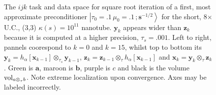 \documentclass[letterpaper,twocolumn,amsmath,amsfont,amssymb,english,aps,jcp,preprintnumbers,groupaddress,nofootinbib,tightenlines,floatfix]{revtex4}
\newcommand{\mat}[1]{\boldsymbol{#1}}
\newcommand{\ot}{  {\scriptstyle \otimes}_{ \tau } }
\newcommand{\ots}{ {\scriptstyle \otimes}_{ \! \tau_s } }
\theoremstyle{plain}
\theoremstyle{remark}
\theoremstyle{plain}
\begin{document}
\begin{figure}[h]
\caption{
The $ijk$ task and data space for square root iteration of a first, most approximate preconditioner 
$\left|\tau_0=.1\,\mu_0=.1\, ; \scriptstyle{\mat{s}^{-1/2}} \right>$ for the short, 8$\times$ U.C., (3,3) $\kappa(s)=10^{11}$ nanotube.
$\mat{y}_k$ appears wider than $\mat{z}_k$ because it is computed at a higher precision, $\tau_s=.001$.  Left to right, pannels 
coorespond to $k=0$ and $k=15$, whilst top to bottom its $\mat{y}_k=h_\alpha[ \mat{x}_{k-1} ] \ots \mat{y}_{k-1}$,
$\mat{z}_k=  \mat{z}_{k-1}  \ot h_\alpha[ \mat{x}_{k-1} ]$ and 
$\mat{x}_k=  \mat{y}_{k}  \ot \mat{z}_{k}$.  Green is $\mat{a}$, maroon is $\mat{b}$, purple is $c$ and black is the volume ${\rm vol}_{a \ot b}$.
Note extreme localization upon convergence. Axes may be labeled incorrectly. }
\end{figure}
\end{document}
